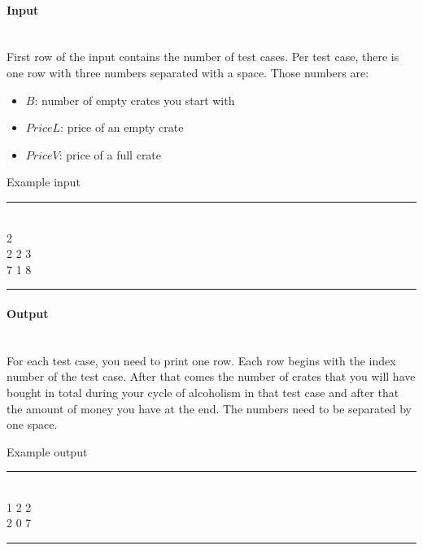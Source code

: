 \documentclass[10pt,a4paper]{article}
\begin{document}
\paragraph{Input\\ \\}
First row of the input contains the number of test cases. Per test case, there is one row with three numbers separated with a space. Those numbers are:
\begin{itemize}
	\item $B$: number of empty crates you start with
	\item $PriceL$: price of an empty crate
	\item $PriceV$: price of a full crate
\end{itemize}

\begin{center}
Example input
\hrule
\end{center}
\mbox{}\\
2 \\
2 2 3\\
7 1 8\\
\hrule

	
\paragraph{Output\\ \\}

For each test case, you need to print one row. Each row begins with the index number of the test case. After that comes the number of crates that you will have bought in total during your cycle of alcoholism in that test case and after that the amount of money you have at the end. The numbers need to be separated by one space.


\begin{center}
Example output
\hrule
\end{center}
\mbox{} \\
1 2 2\\
2 0 7\\
\hrule
\end{document}
